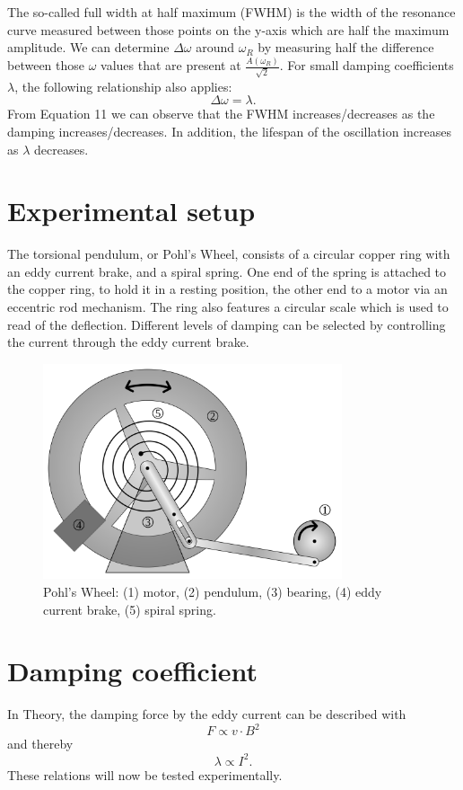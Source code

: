 \documentclass{article}
\begin{document}
The so-called full width at half maximum (FWHM) is the width of the resonance curve measured between those points on the y-axis which are half the maximum amplitude. We can determine $\Delta \omega$ around $\omega_R$ by measuring half the difference between those $\omega$ values that are present at $\frac{A(\omega_R)}{\sqrt{2}}$. For small damping coefficients $\lambda$, the following relationship also applies:
\begin{equation}
    \Delta \omega= \lambda.
\end{equation}
From Equation 11 we can observe that the FWHM increases/decreases as the damping increases/decreases. In addition, the lifespan of the oscillation increases as $\lambda$ decreases.
\section{Experimental setup}
The torsional pendulum, or Pohl's Wheel, consists of a circular copper ring with an eddy current brake, and a spiral spring.
One end of the spring is attached to the copper ring, to hold it in a resting position, the other end to a motor via an eccentric rod mechanism.
The ring also features a circular scale which is used to read of the deflection. Different levels of damping can be selected by controlling the current through the eddy current brake.
\begin{figure}[hbt!]
\centering
\includegraphics[width=250pt]{rad.png}
\caption{Pohl's Wheel: (1) motor, (2) pendulum, (3) bearing, (4) eddy current brake, (5) spiral spring. \cite{3}}
\label{fig:length_eight_mouse}
\end{figure}
\section{Damping coefficient}
In Theory, the damping force by the eddy current can be described with \cite{1}
\begin{equation}
	F \propto v \cdot B^2
\end{equation}
and thereby
\begin{equation}
	\lambda \propto I^2.
\end{equation}
These relations will now be tested experimentally.
\newpage
\end{document}
